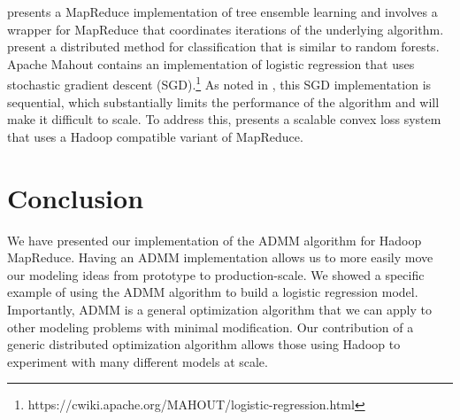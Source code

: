 \documentclass[10pt, conference, compsocconf]{IEEEtran}
\begin{document}
\cite{planet} presents a MapReduce implementation of tree ensemble learning and involves a wrapper for MapReduce that coordinates iterations of the underlying algorithm.  \cite{linkolcz2012} present a distributed method for classification that is similar to random forests. Apache Mahout contains an implementation of logistic regression that uses stochastic gradient descent (SGD).\footnote{https://cwiki.apache.org/MAHOUT/logistic-regression.html}  As noted in \cite{agarwal2011}, this SGD implementation is sequential, which substantially limits the performance of the algorithm and will make it difficult to scale.  To address this, \cite{agarwal2011} presents a scalable convex loss system that uses a Hadoop compatible variant of MapReduce.

\section{Conclusion}\label{sec:conc}
We have presented our implementation of the ADMM algorithm for Hadoop MapReduce.  Having an ADMM implementation allows us to more easily move our modeling ideas from prototype to production-scale.  We showed a specific example of using the ADMM algorithm to build a logistic regression model.  Importantly, ADMM is a general optimization algorithm that we can apply to other modeling problems with minimal modification.  Our contribution of a generic distributed optimization algorithm allows those using Hadoop to experiment with many different models at scale.










%



\end{document}
